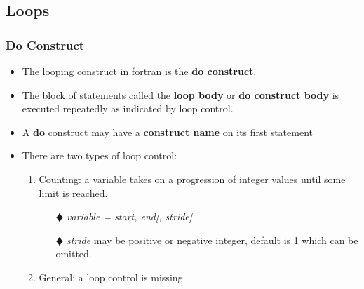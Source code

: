 \documentclass[slidestop,mathserif,compress,xcolor=svgnames]{beamer}
\newenvironment{bblock}[0]
{
\begin{beamerboxesrounded}[upper=uppercol1,lower=lowercol1,shadow=true]}
{\end{beamerboxesrounded}}
\begin{document}
\subsection{Loops}
\begin{frame}
  \frametitle{\small Do Construct}
  \begin{itemize}
    \item The looping construct in fortran is the \textbf{do construct}.
    \item The block of statements called the \textbf{loop body} or \textbf{do construct body} is executed repeatedly as indicated by loop control.
    \item A \textbf{do} construct may have a \textbf{construct name} on its first statement
    \item There are two types of loop control:
    \begin{enumerate}
      \item Counting: a variable takes on a progression of integer values until some limit is reached.
      \begin{itemize}
        \item[$\vardiamond$] \textit{variable = start, end[, stride] }
        \item[$\vardiamond$] \textit{stride} may be positive or negative integer, default is 1 which can be omitted.
      \end{itemize}
      \item General: a loop control is missing
    \end{enumerate}
  \end{itemize}
\end{frame}
\end{document}
